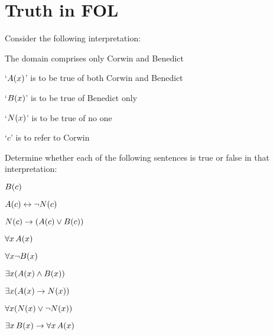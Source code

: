 
\setcounter{chapter}{27}
\chapter{Truth in FOL}\setcounter{ProbPart}{0}
\problempart
\label{pr.TorF1}
Consider the following interpretation:
	\begin{ebullet}
		\item The domain comprises only Corwin and Benedict
		\item `$\mathord{A}(x)$' is to be true of both Corwin and Benedict
		\item `$\mathord{B}(x)$' is to be true of Benedict only
		\item `$\mathord{N}(x)$' is to be true of no one
		\item `$c$' is to refer to Corwin
	\end{ebullet}
Determine whether each of the following sentences is true or false in that interpretation:
\begin{earg}
\item $\mathord{B}(c)$ \hfill {}
\item $\mathord{A}(c) \leftrightarrow \neg \mathord{N}(c)$ \hfill {}
\item $\mathord{N}(c) \rightarrow (\mathord{A}(c) \vee \mathord{B}(c))$ \hfill {}
\item $\forall x\,\mathord{A}(x)$ \hfill {}
\item $\forall x \neg \mathord{B}(x)$ \hfill {}
\item $\exists x(\mathord{A}(x) \wedge \mathord{B}(x))$ \hfill {}
\item $\exists x(\mathord{A}(x) \rightarrow \mathord{N}(x))$ \hfill {}
\item $\forall x(\mathord{N}(x) \vee \neg \mathord{N}(x))$ \hfill {}
\item $\exists x\,\mathord{B}(x) \rightarrow \forall x\,\mathord{A}(x)$ \hfill {}
\end{earg}

